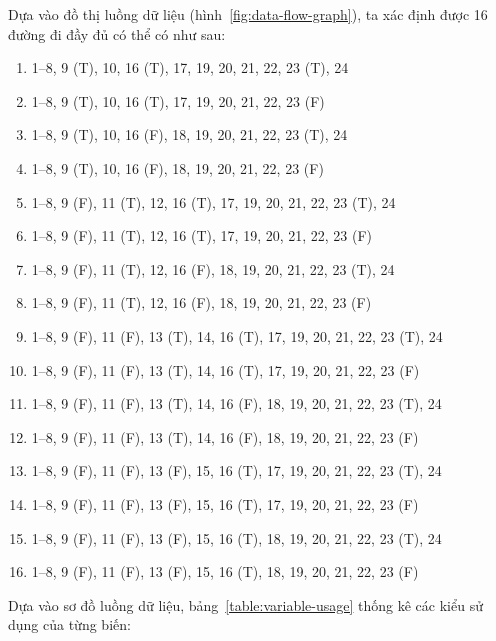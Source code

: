 \documentclass{article}
\begin{document}
\bigskip
\par Dựa vào đồ thị luồng dữ liệu (hình~\ref{fig:data-flow-graph}), ta xác định được 16 đường đi đầy đủ có thể có như sau:
\bigskip

\begin{enumerate}[label = (\arabic*),itemindent=1cm]
    \item 1--8, 9 (T), 10, 16 (T), 17, 19, 20, 21, 22, 23 (T), 24 %
    \item 1--8, 9 (T), 10, 16 (T), 17, 19, 20, 21, 22, 23 (F) %
    \item 1--8, 9 (T), 10, 16 (F), 18, 19, 20, 21, 22, 23 (T), 24 %
    \item 1--8, 9 (T), 10, 16 (F), 18, 19, 20, 21, 22, 23 (F) %
    \item 1--8, 9 (F), 11 (T), 12, 16 (T), 17, 19, 20, 21, 22, 23 (T), 24 %
    \item 1--8, 9 (F), 11 (T), 12, 16 (T), 17, 19, 20, 21, 22, 23 (F) %
    \item 1--8, 9 (F), 11 (T), 12, 16 (F), 18, 19, 20, 21, 22, 23 (T), 24 %
    \item 1--8, 9 (F), 11 (T), 12, 16 (F), 18, 19, 20, 21, 22, 23 (F) %
    \item 1--8, 9 (F), 11 (F), 13 (T), 14, 16 (T), 17, 19, 20, 21, 22, 23 (T), 24 %
    \item 1--8, 9 (F), 11 (F), 13 (T), 14, 16 (T), 17, 19, 20, 21, 22, 23 (F) %
    \item 1--8, 9 (F), 11 (F), 13 (T), 14, 16 (F), 18, 19, 20, 21, 22, 23 (T), 24 %
    \item 1--8, 9 (F), 11 (F), 13 (T), 14, 16 (F), 18, 19, 20, 21, 22, 23 (F) %
    \item 1--8, 9 (F), 11 (F), 13 (F), 15, 16 (T), 17, 19, 20, 21, 22, 23 (T), 24 %
    \item 1--8, 9 (F), 11 (F), 13 (F), 15, 16 (T), 17, 19, 20, 21, 22, 23 (F) %
    \item 1--8, 9 (F), 11 (F), 13 (F), 15, 16 (T), 18, 19, 20, 21, 22, 23 (T), 24 %
    \item 1--8, 9 (F), 11 (F), 13 (F), 15, 16 (T), 18, 19, 20, 21, 22, 23 (F) %
\end{enumerate}

\bigskip
\bigskip
\bigskip
\par Dựa vào sơ đồ luồng dữ liệu, bảng~\ref{table:variable-usage} thống kê các kiểu sử dụng của từng biến:
\bigskip
\bigskip
\bigskip
\end{document}
